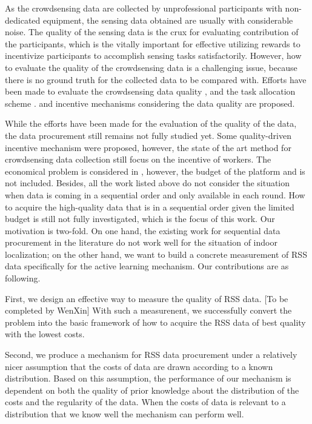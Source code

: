 \documentclass[10pt,conference,compsocconf,letterpaper]{IEEEtran}
\begin{document}
As the crowdsensing data are collected by unprofessional participants with non-dedicated equipment, the sensing data obtained are usually with considerable noise. The quality of the sensing data is the crux for evaluating contribution of the participants, which is the vitally important for effective utilizing rewards to incentivize participants to accomplish sensing tasks satisfactorily. However, how to evaluate the quality of the crowdsensing data is a challenging issue, because there is no ground truth for the collected data to be compared with. Efforts have been made to evaluate the crowdsensing data quality \cite{ Crowdloc14}, and the task allocation scheme \cite{ Taskselection15, recruit}. and incentive mechanisms considering the data quality are proposed. 

While the efforts have been made for the evaluation of the quality of the data, the data procurement still remains not fully studied yet. Some quality-driven incentive mechanism\cite{Lbs2, noise,Pengdan15, incentive, Incentive2} were proposed, however, the state of the art method for crowdsensing data collection still focus on the incentive of workers. The economical problem is considered in \cite{Pengdan15}, however, the budget of the platform and is not included. Besides, all the work listed above do not consider the situation when data is coming in a sequential order and only 
available in each round. How to acquire the high-quality data that is in a sequential order given the limited budget is still not fully investigated, which is the focus of this work. Our motivation is two-fold. On one hand, the existing work for sequential data procurement in the literature \cite{abernethy2015low}do not work well for the situation of indoor localization; on the other hand, we want to build a concrete measurement of RSS data specifically for the active learning mechanism. Our contributions are as following.

First, we design an effective way to measure the quality of RSS data. [To be completed by WenXin] With such a measurenent, we successfully convert the problem into the basic framework of how to acquire the RSS data of best quality with the lowest costs.

Second, we produce a mechanism for RSS data procurement under a relatively nicer assumption that the costs of data are drawn according to a known distribution. Based on this assumption, the performance of our mechanism is dependent on both the quality of prior knowledge about the distribution of the costs and the regularity of the data. When the costs of data is relevant to a distribution that we know well the mechanism can perform well. 
\end{document}
